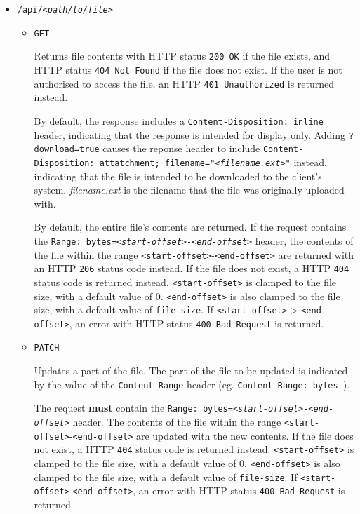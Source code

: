 \documentclass[12pt,a4paper]{report}
\begin{document}
\begin{itemize}
	\item \texttt{/api/\textsl{<path/to/file>}}

	      \begin{itemize}
		      \item \texttt{GET}

		            Returns file contents with HTTP status \texttt{200 OK} if the file exists, and HTTP status \texttt{404 Not Found} if the file does not exist.
		            If the user is not authorised to access the file, an HTTP \texttt{401 Unauthorized} is returned instead.

		            By default, the response includes a \texttt{Content-Disposition: inline} header, indicating that the response is intended for display only.
		            Adding \texttt{?download=true} causes the reponse header to include \texttt{Content-Disposition: attatchment; filename="\textsl{<filename.ext>}"} instead, indicating that the file is intended to be downloaded to the client's system. \textsl{filename.ext} is the filename that the file was originally uploaded with.

		            By default, the entire file's contents are returned.
		            If the request contains the \texttt{Range: bytes=\textsl{<start-offset>}-\textsl{<end-offset>}} header, the contents of the file within the range \texttt{<start-offset>}-\texttt{<end-offset>} are returned with an HTTP \texttt{206} status code instead.
		            If the file does not exist, a HTTP \texttt{404} status code is returned instead.
		            \texttt{<start-offset>} is clamped to the file size, with a default value of 0.
		            \texttt{<end-offset>} is also clamped to the file size, with a default value of \texttt{file-size}.
		            If \texttt{<start-offset>} > \texttt{<end-offset>}, an error with HTTP status \texttt{400 Bad Request} is returned.

		      \item \texttt{PATCH}

		            Updates a part of the file.
		            The part of the file to be updated is indicated by the value of the \texttt{Content-Range} header (eg. \texttt{Content-Range: bytes }).

		            The request \textbf{must} contain the \texttt{Range: bytes=\textsl{<start-offset>}-\textsl{<end-offset>}} header.
		            The contents of the file within the range \texttt{<start-offset>}-\texttt{<end-offset>} are updated with the new contents.
		            If the file does not exist, a HTTP \texttt{404} status code is returned instead.
		            \texttt{<start-offset>} is clamped to the file size, with a default value of 0.
		            \texttt{<end-offset>} is also clamped to the file size, with a default value of \texttt{file-size}.
		            If \texttt{<start-offset>} \> \texttt{<end-offset>}, an error with HTTP status \texttt{400 Bad Request} is returned.


\end{itemize}
\end{itemize}
\end{document}
